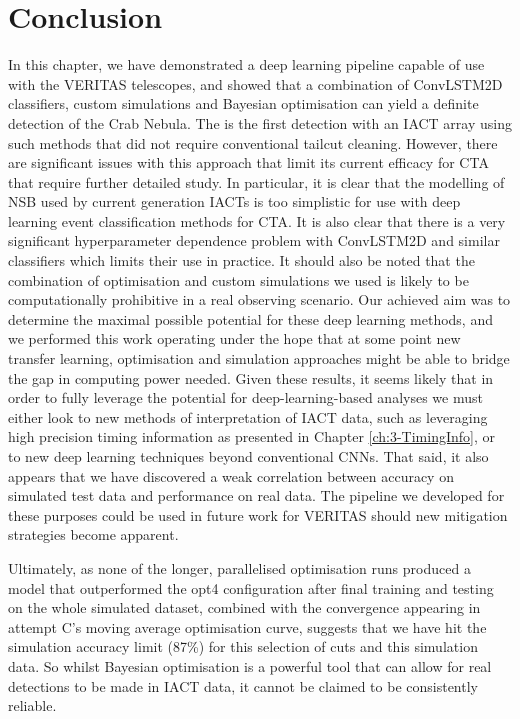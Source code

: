 \section{Conclusion}
In this chapter, we have demonstrated a deep learning pipeline capable of use with the VERITAS telescopes, and showed that a combination of ConvLSTM2D classifiers, custom simulations and Bayesian optimisation can yield a definite detection of the Crab Nebula. The is the first detection with an IACT array using such methods that did not require conventional tailcut cleaning. However, there are significant issues with this approach that limit its current efficacy for CTA that require further detailed study. In particular, it is clear that the modelling of NSB used by current generation IACTs is too simplistic for use with deep learning event classification methods for CTA. It is also clear that there is a very significant hyperparameter dependence problem with ConvLSTM2D and similar classifiers which limits their use in practice. It should also be noted that the combination of optimisation and custom simulations we used is likely to be computationally prohibitive in a real observing scenario. Our achieved aim was to determine the maximal possible potential for these deep learning methods, and we performed this work operating under the hope that at some point new transfer learning, optimisation and simulation approaches might be able to bridge the gap in computing power needed. Given these results, it seems likely that in order to fully leverage the potential for deep-learning-based analyses we must either look to new methods of interpretation of IACT data, such as leveraging high precision timing information as presented in Chapter \ref{ch:3-TimingInfo}, or to new deep learning techniques beyond conventional CNNs. That said, it also appears that we have discovered a weak correlation between accuracy on simulated test data and performance on real data. The pipeline we developed for these purposes could be used in future work for VERITAS should new mitigation strategies become apparent.

Ultimately, as none of the longer, parallelised optimisation runs produced a model that outperformed the opt4 configuration after final training and testing on the whole simulated dataset, combined with the convergence appearing in attempt C's moving average optimisation curve, suggests that we have hit the simulation accuracy limit (87\%) for this selection of cuts and this simulation data. So whilst Bayesian optimisation is a powerful tool that can allow for real detections to be made in IACT data, it cannot be claimed to be consistently reliable. 
